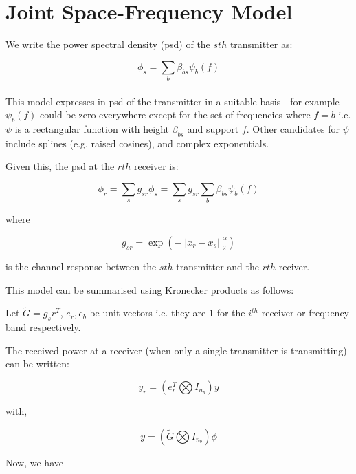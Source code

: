 \section{Joint Space-Frequency Model}
We write the power spectral density (psd) of the \(sth\) transmitter as:

\begin{equation}
\phi_s = \sum_b \beta_{bs} \psi_b\left(f\right)
\label{basis_expansion}
\end{equation}
\\ 

This model expresses in psd of the transmitter in a suitable basis - for example \(\psi_b\left(f\right)\) could be zero everywhere except for the set of frequencies where \(f=b\) i.e. \(\psi\) is a rectangular function with height \(\beta_{bs}\) and support \(f\). Other candidates for \(\psi\) include splines (e.g. raised cosines), and complex exponentials. 

Given this, the psd at the \(rth\) receiver is:

\begin{equation}
\phi_r = \sum_s g_{sr}\phi_s = \sum_s g_{sr} \sum _b \beta_{bs}\psi_b\left(f\right)
\end{equation}

where

\begin{equation}
g_{sr} = \exp\left(-||x_r - x_s||_2^\alpha\right)
\end{equation}

is the channel response between the \(sth\) transmitter and the \(rth\) reciver.

This model can be summarised using Kronecker products as follows:

Let \(\tilde{G} = g_sr^T\), \(e_r, e_b\) be unit vectors i.e. they are \(1\) for the \(i^{th}\) receiver or frequency band respectively.

The received power at a receiver (when only a single transmitter is transmitting) can be written:

\begin{equation}
y_r = \left(	e_r^T \bigotimes I_{n_b}\right) y
\end{equation}

with,

\begin{equation}
y = \left( \tilde{G} \bigotimes I_{n_b} \right) \phi
\end{equation}

Now, we have

